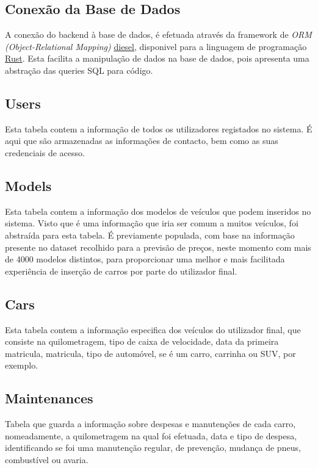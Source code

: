 \documentclass[a4paper]{report}
\begin{document}
\subsection{Conexão da Base de Dados}

A conexão do backend à base de dados, é efetuada através da framework de \textit{ORM (Object-Relational Mapping)} 
\href{http://diesel.rs}{diesel}, disponivel para a linguagem de programação \href{http://rust-lang.org}{Rust}.
Esta facilita a manipulação de dados na base de dados, pois apresenta uma abstração das queries SQL para código.

\subsection{Users}

Esta tabela contem a informação de todos os utilizadores registados no sistema. 
É aqui que são armazenadas as informações de contacto, bem como as suas credenciais de acesso.

\subsection{Models}

Esta tabela contem a informação dos modelos de veículos que podem inseridos no sistema.
Visto que é uma informação que iria ser comum a muitos veículos, foi abstraída para esta
tabela. É previamente populada, com base na informação presente no dataset recolhido para a
previsão de preços, neste momento com mais de 4000 modelos distintos, para
proporcionar uma melhor e mais facilitada experiência de inserção de carros por parte do
utilizador final.

\subsection{Cars}

Esta tabela contem a informação especifica dos veículos do utilizador final, que consiste na 
quilometragem, tipo de caixa de velocidade, data da primeira matricula, matricula, tipo de automóvel,
se é um carro, carrinha ou SUV, por exemplo.

\subsection{Maintenances}

Tabela que guarda a informação sobre despesas e manutenções de cada carro, nomeadamente, a
quilometragem na qual foi efetuada, data e tipo de despesa, identificando se foi uma
manutenção regular, de prevenção, mudança de pneus, combustível ou avaria.
\end{document}

